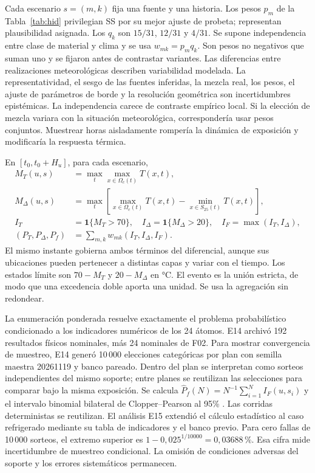 \documentclass[11pt,a4paper]{article}
\begin{document}
Cada escenario $s=(m,k)$ fija una fuente y una historia. Los pesos $p_m$ de la Tabla~\ref{tab:hid} privilegian SS por su mejor ajuste de probeta; representan plausibilidad asignada. Los $q_k$ son $15/31$, $12/31$ y $4/31$. Se supone independencia entre clase de material y clima y se usa $w_{mk}=p_mq_k$. Son pesos no negativos que suman uno y se fijaron antes de contrastar variantes. Las diferencias entre realizaciones meteorológicas describen variabilidad modelada. La representatividad, el sesgo de las fuentes inferidas, la mezcla real, los pesos, el ajuste de parámetros de borde y la resolución geométrica son incertidumbres epistémicas. La independencia carece de contraste empírico local. Si la elección de mezcla variara con la situación meteorológica, correspondería usar pesos conjuntos. Muestrear horas aisladamente rompería la dinámica de exposición y modificaría la respuesta térmica.

En $[t_0,t_0+H_u]$, para cada escenario,
\begin{align}
M_T(u,s)&=\max_t\max_{x\in\Omega_c(t)} T(x,t),\\
M_\Delta(u,s)&=\max_t\left[\max_{x\in\Omega_c(t)}T(x,t)-\min_{x\in S_{25}(t)}T(x,t)\right],\\
I_T&=\mathbf 1\{M_T>70\},\quad I_\Delta=\mathbf 1\{M_\Delta>20\},\quad I_F=\max(I_T,I_\Delta),\\
(P_T,P_\Delta,P_f)&=\sum_{m,k}w_{mk}(I_T,I_\Delta,I_F).
\label{eq:weights}
\end{align}
El mismo instante gobierna ambos términos del diferencial, aunque sus ubicaciones pueden pertenecer a distintas capas y variar con el tiempo. Los estados límite son $70-M_T$ y $20-M_\Delta$ en °C. El evento es la unión estricta, de modo que una excedencia doble aporta una unidad. Se usa la agregación sin redondear.

La enumeración ponderada resuelve exactamente el problema probabilístico condicionado a los indicadores numéricos de los 24 átomos. E14 archivó 192 resultados físicos nominales, más 24 nominales de F02. Para mostrar convergencia de muestreo, E14 generó 10\,000 elecciones categóricas por plan con semilla maestra 20261119 y banco pareado. Dentro del plan se interpretan como sorteos independientes del mismo soporte; entre planes se reutilizan las selecciones para comparar bajo la misma exposición. Se calcula $\widehat P_f(N)=N^{-1}\sum_{i=1}^N I_F(u,s_i)$ y el intervalo binomial bilateral de Clopper--Pearson al 95\% \cite{cp,e14}. Las corridas deterministas se reutilizan. El análisis E15 extendió el cálculo estadístico al caso refrigerado mediante su tabla de indicadores y el banco previo. Para cero fallas de 10\,000 sorteos, el extremo superior es $1-0{,}025^{1/10000}=0{,}03688\,\%$. Esa cifra mide incertidumbre de muestreo condicional. La omisión de condiciones adversas del soporte y los errores sistemáticos permanecen.
\end{document}
